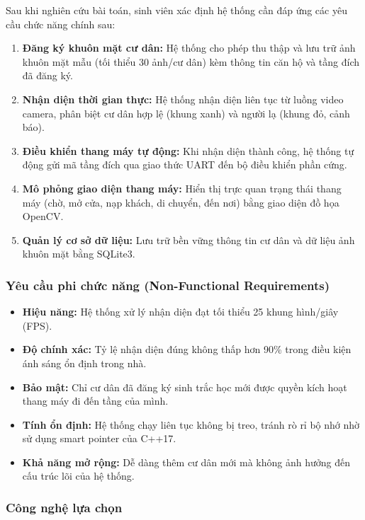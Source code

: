 \documentclass[12pt,a4paper]{article}
\begin{document}
Sau khi nghiên cứu bài toán, sinh viên xác định hệ thống cần đáp ứng các yêu cầu chức năng chính sau:

\begin{enumerate}
    \item \textbf{Đăng ký khuôn mặt cư dân:} Hệ thống cho phép thu thập và lưu trữ ảnh khuôn mặt mẫu (tối thiểu 30 ảnh/cư dân) kèm thông tin căn hộ và tầng đích đã đăng ký.
    \item \textbf{Nhận diện thời gian thực:} Hệ thống nhận diện liên tục từ luồng video camera, phân biệt cư dân hợp lệ (khung xanh) và người lạ (khung đỏ, cảnh báo).
    \item \textbf{Điều khiển thang máy tự động:} Khi nhận diện thành công, hệ thống tự động gửi mã tầng đích qua giao thức UART đến bộ điều khiển phần cứng.
    \item \textbf{Mô phỏng giao diện thang máy:} Hiển thị trực quan trạng thái thang máy (chờ, mở cửa, nạp khách, di chuyển, đến nơi) bằng giao diện đồ họa OpenCV.
    \item \textbf{Quản lý cơ sở dữ liệu:} Lưu trữ bền vững thông tin cư dân và dữ liệu ảnh khuôn mặt bằng SQLite3.
\end{enumerate}

\subsubsection{Yêu cầu phi chức năng (Non-Functional Requirements)}

\begin{itemize}
    \item \textbf{Hiệu năng:} Hệ thống xử lý nhận diện đạt tối thiểu 25 khung hình/giây (FPS).
    \item \textbf{Độ chính xác:} Tỷ lệ nhận diện đúng không thấp hơn 90\% trong điều kiện ánh sáng ổn định trong nhà.
    \item \textbf{Bảo mật:} Chỉ cư dân đã đăng ký sinh trắc học mới được quyền kích hoạt thang máy đi đến tầng của mình.
    \item \textbf{Tính ổn định:} Hệ thống chạy liên tục không bị treo, tránh rò rỉ bộ nhớ nhờ sử dụng smart pointer của C++17.
    \item \textbf{Khả năng mở rộng:} Dễ dàng thêm cư dân mới mà không ảnh hưởng đến cấu trúc lõi của hệ thống.
\end{itemize}

\subsubsection{Công nghệ lựa chọn}
\end{document}
